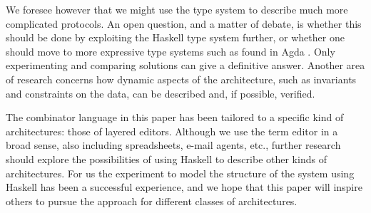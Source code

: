 \documentclass{llncs}
\begin{document}
We foresee however that we might use the type system to describe much more complicated protocols. An open question, and a matter of debate, is whether this should be done by exploiting the Haskell type system further, or whether one should move to more expressive type systems such as found in Agda \cite{norell:thesis}. Only experimenting and comparing solutions can give a definitive answer. Another area of research concerns how dynamic aspects of the architecture, such as invariants and constraints on the data, can be described and, if possible, verified.

The combinator language in this paper has been tailored to a specific kind of architectures: those of layered editors. Although we use the term editor in a broad sense, also including spreadsheets, e-mail agents, etc., further research should explore the possibilities of using Haskell to describe other kinds of architectures. For us the experiment to model the structure of the system using Haskell has been a successful experience, and we hope that this paper will inspire others to pursue the approach for different classes of architectures.  



\end{document}
